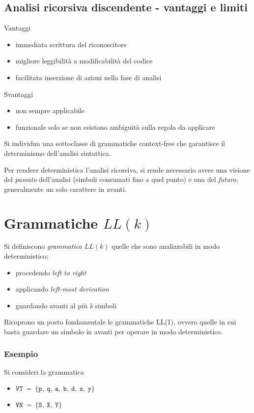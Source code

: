 \subsection{Analisi ricorsiva discendente - vantaggi e limiti}
Vantaggi
\begin{itemize}
    \item immediata scrittura del riconoscitore
    \item migliore leggibilità a modificabilità del codice
    \item facilitata inserzione di azioni nella fase di analisi
\end{itemize}
Svantaggi
\begin{itemize}
    \item non sempre applicabile
    \item funzionale solo se non esistono ambiguità sulla regola da applicare
\end{itemize}

Si individua una sottoclasse di grammatiche context-free che garantisce il determinismo dell'analisi sintattica.

Per rendere deterministica l'analisi ricorsiva, si rende necessario avere una visione del \textit{passato} dell'analisi (simboli consumati fino a quel punto) e una del \textit{futuro}, generalmente un solo carattere in avanti.

\section{Grammatiche $LL(k)$}
Si definiscono \textit{grammatica $LL(k)$} quelle che sono analizzabili in modo deterministico:
\begin{itemize}
    \item procedendo \textit{left to right}
    \item applicando \textit{left-most derivation}
    \item guardando avanti al più \textit{k} simboli
\end{itemize}

Ricoprono un posto fondamentale le grammatiche LL(1), ovvero quelle in cui basta guardare un simbolo in avanti per operare in modo deterministico.

\subsubsection{Esempio}
Si consideri la grammatica
\begin{itemize}
    \item $\texttt{VT}\ =\ \{\texttt{p},\ \texttt{q},\ \texttt{a},\ \texttt{b},\ \texttt{d},\ \texttt{x},\ \texttt{y}\}$
    \item $\texttt{VN}\ =\ \{\texttt{S},\ \texttt{X},\ \texttt{Y}\}$
\end{itemize}


